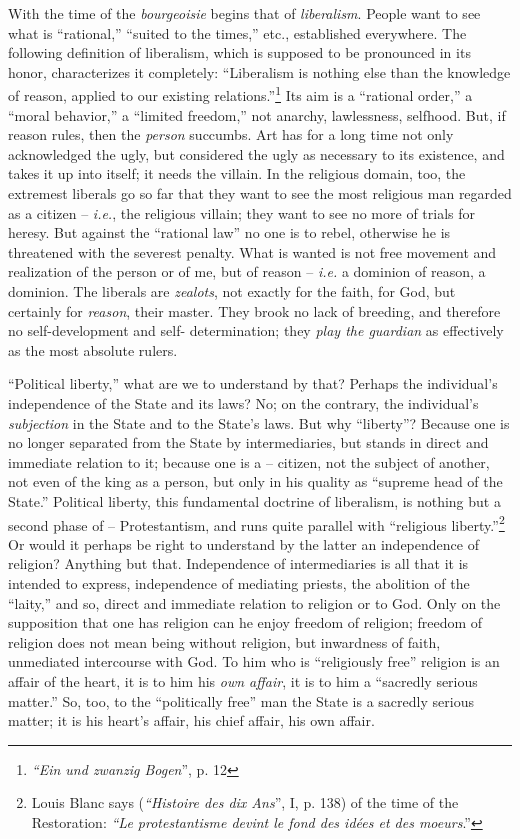 With the time of the \textit{bourgeoisie} begins that of \textit{liberalism}. 
People want to see what is ``rational,'' ``suited to the times,'' etc., 
established everywhere. The following definition of liberalism, which is 
supposed to be pronounced in its honor, characterizes it completely: 
``Liberalism is nothing else than the knowledge of reason, applied to our 
existing relations.''\footnote{\textit{``Ein und zwanzig Bogen}'', p. 12} 
Its aim is a ``rational order,'' a ``moral behavior,'' a ``limited 
freedom,'' not anarchy, lawlessness, selfhood. But, if reason rules, then the 
\textit{person} succumbs. Art has for a long time not only acknowledged the 
ugly, but considered the ugly as necessary to its existence, and takes it up 
into itself; it needs the villain. In the religious domain, too, the extremest 
liberals go so far that they want to see the most religious man regarded as a 
citizen -- \textit{i.e.}, the religious villain; they want to see no more of 
trials for heresy. But against the ``rational law'' no one is to rebel, 
otherwise he is threatened with the severest penalty. What is wanted is not 
free movement and realization of the person or of me, but of reason -- 
\textit{i.e.} a dominion of reason, a dominion. The liberals are 
\textit{zealots}, not exactly for the faith, for God, but certainly for 
\textit{reason}, their master. They brook no lack of breeding, and therefore 
no self-development and self- determination; they \textit{play the guardian} 
as effectively as the most absolute rulers.

``Political liberty,'' what are we to understand by that? Perhaps the 
individual's independence of the State and its laws? No; on the contrary, the 
individual's \textit{subjection} in the State and to the State's laws. But why 
``liberty''? Because one is no longer separated from the State by 
intermediaries, but stands in direct and immediate relation to it; because one 
is a -- citizen, not the subject of another, not even of the king as a person, 
but only in his quality as ``supreme head of the State.'' Political liberty, 
this fundamental doctrine of liberalism, is nothing but a second phase of -- 
Protestantism, and runs quite parallel with ``religious 
liberty.''\footnote{Louis Blanc says (\textit{``Histoire des dix Ans}'', I, 
p. 138) of the time of the Restoration: \textit{``Le protestantisme devint le 
fond des id\'ees et des moeurs}.''} Or would it perhaps be right to 
understand by the latter an independence of religion? Anything but that. 
Independence of intermediaries is all that it is intended to express, 
independence of mediating priests, the abolition of the ``laity,'' and so, 
direct and immediate relation to religion or to God. Only on the supposition 
that one has religion can he enjoy freedom of religion; freedom of religion 
does not mean being without religion, but inwardness of faith, unmediated 
intercourse with God. To him who is ``religiously free'' religion is an 
affair of the heart, it is to him his \textit{own affair}, it is to him a 
``sacredly serious matter.'' So, too, to the ``politically free'' man the 
State is a sacredly serious matter; it is his heart's affair, his chief 
affair, his own affair.

